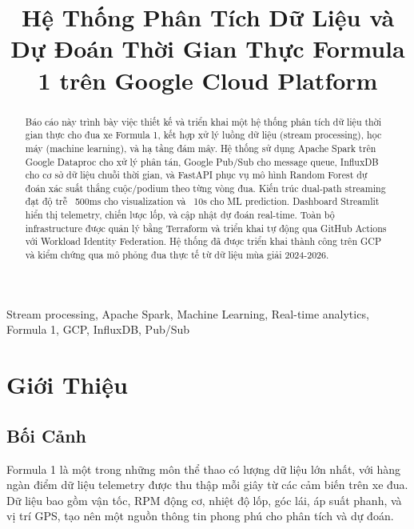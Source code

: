 \documentclass[conference,10pt]{IEEEtran}
\begin{document}
\title{Hệ Thống Phân Tích Dữ Liệu và Dự Đoán Thời Gian Thực Formula 1 trên Google Cloud Platform}

\author{
}

\maketitle

\begin{abstract}
Báo cáo này trình bày việc thiết kế và triển khai một hệ thống phân tích dữ liệu thời gian thực cho đua xe Formula 1, kết hợp xử lý luồng dữ liệu (stream processing), học máy (machine learning), và hạ tầng đám mây. Hệ thống sử dụng Apache Spark trên Google Dataproc cho xử lý phân tán, Google Pub/Sub cho message queue, InfluxDB cho cơ sở dữ liệu chuỗi thời gian, và FastAPI phục vụ mô hình Random Forest dự đoán xác suất thắng cuộc/podium theo từng vòng đua. Kiến trúc dual-path streaming đạt độ trễ ~500ms cho visualization và ~10s cho ML prediction. Dashboard Streamlit hiển thị telemetry, chiến lược lốp, và cập nhật dự đoán real-time. Toàn bộ infrastructure được quản lý bằng Terraform và triển khai tự động qua GitHub Actions với Workload Identity Federation. Hệ thống đã được triển khai thành công trên GCP và kiểm chứng qua mô phỏng đua thực tế từ dữ liệu mùa giải 2024-2026.
\end{abstract}

\begin{IEEEkeywords}
Stream processing, Apache Spark, Machine Learning, Real-time analytics, Formula 1, GCP, InfluxDB, Pub/Sub
\end{IEEEkeywords}

\section{Giới Thiệu}

\subsection{Bối Cảnh}
Formula 1 là một trong những môn thể thao có lượng dữ liệu lớn nhất, với hàng ngàn điểm dữ liệu telemetry được thu thập mỗi giây từ các cảm biến trên xe đua. Dữ liệu bao gồm vận tốc, RPM động cơ, nhiệt độ lốp, góc lái, áp suất phanh, và vị trí GPS, tạo nên một nguồn thông tin phong phú cho phân tích và dự đoán.
\end{document}
